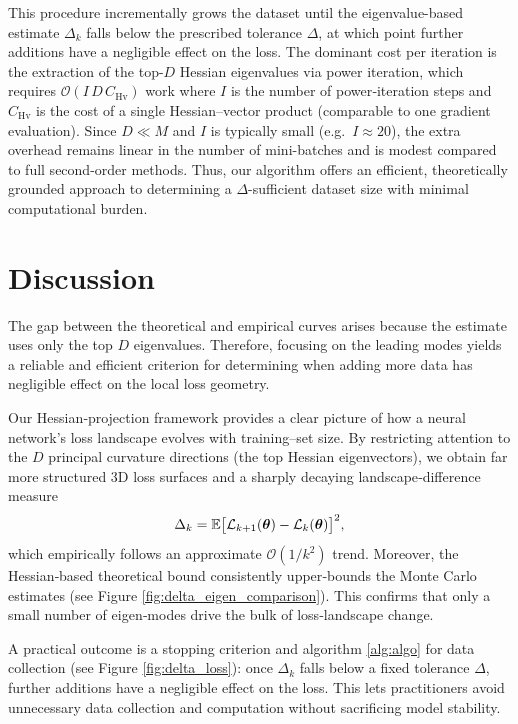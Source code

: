 \documentclass{article}
\begin{document}
This procedure incrementally grows the dataset until the eigenvalue-based estimate $\Delta_k$ falls below the prescribed
tolerance $\Delta$, at which point further additions have a negligible effect on the loss. The dominant cost per iteration is the
extraction of the top-$D$ Hessian eigenvalues via power iteration, which requires $\mathcal O(I\,D\,C_{\mathrm{Hv}})$ work where $I$
is the number of power‐iteration steps and $C_{\mathrm{Hv}}$ is the cost of a single Hessian–vector product (comparable to one
gradient evaluation). Since $D\ll M$ and $I$ is typically small (e.g.\ $I\approx 20$), the extra overhead
remains linear in the number of mini-batches and is modest compared to full second-order methods. Thus, our algorithm offers an
efficient, theoretically grounded approach to determining a $\Delta$-sufficient dataset size with minimal computational burden.


\section{Discussion}\label{sec:disc}

The gap between the theoretical and empirical curves arises because the estimate uses only the top $D$ eigenvalues. Therefore, focusing on
the leading modes yields a reliable and efficient criterion for determining when adding more data has negligible effect on the local loss
geometry.

Our Hessian‐projection framework provides a clear picture of how a neural network’s loss landscape evolves with training–set size.
By restricting attention to the $D$ principal curvature directions (the top Hessian eigenvectors), we obtain far more structured
3D loss surfaces and a sharply decaying landscape‐difference measure
$$
  \Delta_k =
  \mathbb{E}\bigl[\mathcal{L}_{k+1}(\boldsymbol{\theta}) - \mathcal{L}_k(\boldsymbol{\theta})\bigr]^2,
$$
which empirically follows an approximate $\mathcal{O}(1/k^2)$ trend. Moreover, the Hessian‐based theoretical bound
consistently upper‐bounds the Monte Carlo estimates (see Figure \ref{fig:delta_eigen_comparison}). This confirms that only a small number
of eigen‐modes drive the bulk of loss‐landscape change.

A practical outcome is a stopping criterion and algorithm \ref{alg:algo} for data collection (see Figure \ref{fig:delta_loss}):
once $\Delta_k$ falls below a fixed tolerance $\Delta$, further additions have a negligible effect on the loss. This lets practitioners
avoid unnecessary data collection and computation without sacrificing model stability.
\end{document}

